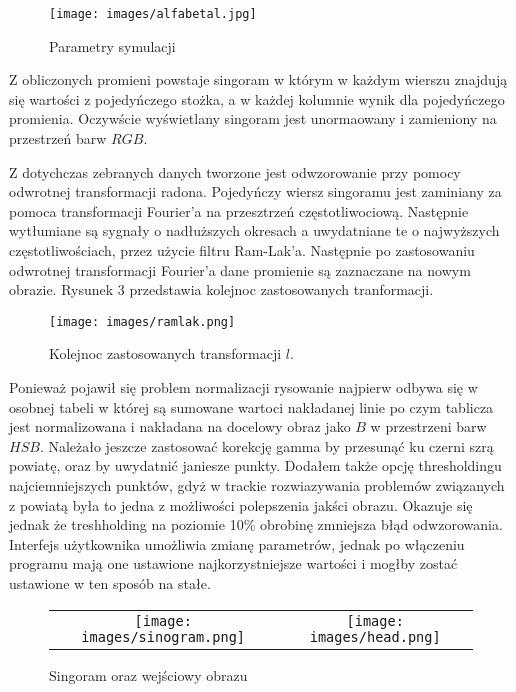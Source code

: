 \documentclass{article}
\begin{document}
\begin{figure}
\begin{center}
\texttt{[image: images/alfabetal.jpg]}
\end{center}
\caption{Parametry symulacji}
\end{figure}

Z obliczonych promieni powstaje singoram w którym w każdym wierszu znajdują się wartości z pojedyńczego stożka, a w każdej kolumnie wynik dla pojedyńczego promienia. Oczywście wyświetlany singoram jest unormaowany i zamieniony na przestrzeń barw $RGB$.

Z dotychczas zebranych danych tworzone jest odwzorowanie przy pomocy odwrotnej transformacji radona. Pojedyńczy wiersz singoramu jest zaminiany za pomoca transformacji Fourier'a na przesztrzeń częstotliwociową. Następnie wytłumiane są sygnały o nadłuższych okresach a uwydatniane te o najwyższych częstotliwościach, przez użycie filtru Ram-Lak'a. Następnie po zastosowaniu odwrotnej transformacji Fourier'a dane promienie są zaznaczane na nowym obrazie. Rysunek 3 przedstawia kolejnoc zastosowanych tranformacji.
\begin{figure}
\texttt{[image: images/ramlak.png]}
\caption{Kolejnoc zastosowanych transformacji $l$.}
\end{figure}
Ponieważ pojawił się problem normalizacji rysowanie najpierw odbywa się w osobnej tabeli w której są sumowane wartoci nakładanej linie po czym tablicza jest normalizowana i nakładana na docelowy obraz jako $B$ w przestrzeni barw $HSB$. Należało jeszcze zastosować korekcję gamma by przesunąć ku czerni szrą powiatę, oraz by uwydatnić janiesze punkty. Dodałem także opcję thresholdingu najciemniejszych punktów, gdyż  w trackie rozwiazywania problemów związanych z powiatą była to jedna z możliwości polepszenia jakści obrazu. Okazuje się jednak że treshholding na poziomie 10\% obrobinę zmniejsza błąd odwzorowania.  Interfejs użytkownika umożliwia zmianę parametrów, jednak po włączeniu programu mają one ustawione najkorzystniejsze wartości i mogłby zostać ustawione w ten sposób na stałe.
\begin{figure}
\begin{center}
	 \begin{tabular}{cc}
\texttt{[image: images/sinogram.png]} &
\texttt{[image: images/head.png]}
	\end{tabular}
\end{center}
\caption{Singoram oraz wejściowy obrazu}
\end{figure}
\end{document}

